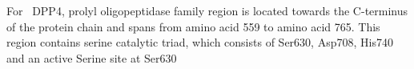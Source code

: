 For~ DPP4, prolyl oligopeptidase family region is located towards the C-terminus of the protein chain and spans from amino acid 559 to amino acid 765. This region contains serine catalytic triad, which consists of Ser630, Asp708, His740 and an active Serine site at Ser630  